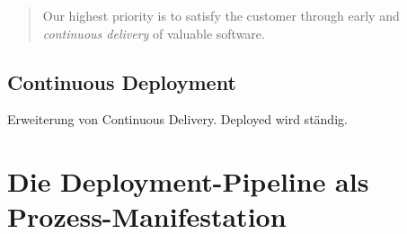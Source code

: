 \begin{quote}
  Our highest priority is to satisfy the customer through early and \emph{continuous delivery} of valuable software.
\end{quote}


\subsection{Continuous Deployment}

Erweiterung von Continuous Delivery. Deployed wird ständig.


\section{Die Deployment-Pipeline als Prozess-Manifestation} \label{sec02:deployment-pipeline}
